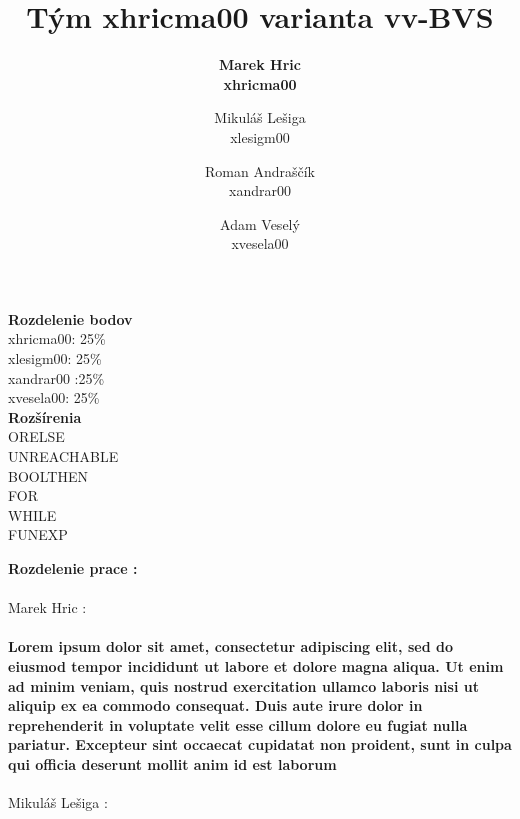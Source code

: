 \documentclass[12pt]{article}
\begin{document}
 
 
\title{\Huge \textbf{Tým xhricma00 varianta vv-BVS}}

\author{\bf Marek Hric \\
\bf xhricma00
\and Mikuláš Lešiga\\
 xlesigm00
\and Roman Andraščík \\
 xandrar00
\and Adam Veselý \\ 
xvesela00
}

\maketitle
\bigskip
\begin{center}
 \Large \textbf{Rozdelenie bodov}  \normalsize
 \\ 
\medskip
xhricma00: 25\% \\
xlesigm00: 25\% \\
xandrar00 :25\% \\
xvesela00: 25\%  \\
\bigskip
 \Large \textbf{Rozšírenia} \normalsize
\\
\medskip
ORELSE\\
UNREACHABLE\\
BOOLTHEN\\
FOR\\
WHILE\\
FUNEXP\\
\end{center}

\newpage

\noindent \Large \textbf{Rozdelenie prace :} \\
\noindent\makebox[\linewidth]{\rule{\textwidth}{0.4pt}}
\newline \\
\indent \large Marek Hric : \normalsize
\paragraph{Lorem ipsum dolor sit amet, consectetur adipiscing elit, sed do eiusmod tempor incididunt ut labore et dolore magna aliqua. Ut enim ad minim veniam, quis nostrud exercitation ullamco laboris nisi ut aliquip ex ea commodo consequat. Duis aute irure dolor in reprehenderit in voluptate velit esse cillum dolore eu fugiat nulla pariatur. Excepteur sint occaecat cupidatat non proident, sunt in culpa qui officia deserunt mollit anim id est laborum \newline \\} 
\large Mikuláš Lešiga :
\normalsize
\end{document}

